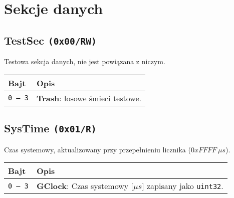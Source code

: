 \section{Sekcje danych}
\label{Sec_SekcjeDanych}

\subsection{TestSec \texttt{(0x00/RW)}}
\label{TestSec}
Testowa sekcja danych, nie jest powiązana z niczym.
\begin{longtable}{|p{\BWIDTH}|p{\OWIDTH}|}
	\hline
	\textbf{Bajt} & \textbf{Opis}\\ 
	\hline
	\hline
	\texttt{0 -- 3} & \textbf{Trash}: losowe śmieci testowe.\\
	\hline
\end{longtable}

\subsection{SysTime \texttt{(0x01/R)}}
\label{SysTime}
Czas systemowy, aktualizowany przy przepełnieniu licznika ($0xFFFF\ \mu s$).
\begin{longtable}{|p{\BWIDTH}|p{\OWIDTH}|}
	\hline
	\textbf{Bajt} & \textbf{Opis}\\ 
	\hline
	\hline
	\texttt{0 -- 3} & \textbf{GClock}: Czas systemowy [$\mu s$] zapisany jako \texttt{uint32}.\\
	\hline
\end{longtable}